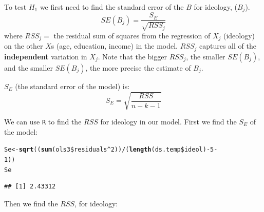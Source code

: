 \documentclass[11pt,openany]{book}\usepackage[]{graphicx}\usepackage[]{color}
\makeatletter
\newcommand{\hlnum}[1]{\textcolor[rgb]{0.686,0.059,0.569}{#1}}%
\newcommand{\hlopt}[1]{\textcolor[rgb]{0,0,0}{#1}}%
\newcommand{\hlstd}[1]{\textcolor[rgb]{0.345,0.345,0.345}{#1}}%
\newcommand{\hlkwb}[1]{\textcolor[rgb]{0.69,0.353,0.396}{#1}}%
\newcommand{\hlkwd}[1]{\textcolor[rgb]{0.737,0.353,0.396}{\textbf{#1}}}%
\newenvironment{kframe}{%
 \def\at@end@of@kframe{}%
 \ifinner\ifhmode%
  \def\at@end@of@kframe{\end{minipage}}%
  \begin{minipage}{\columnwidth}%
 \fi\fi%
 \def\FrameCommand##1{\hskip\@totalleftmargin \hskip-\fboxsep
 \colorbox{shadecolor}{##1}\hskip-\fboxsep
     \hskip-\linewidth \hskip-\@totalleftmargin \hskip\columnwidth}%
 \MakeFramed {\advance\hsize-\width
   \@totalleftmargin\z@ \linewidth\hsize
   \@setminipage}}%
 {\par\unskip\endMakeFramed%
 \at@end@of@kframe}
\newenvironment{knitrout}{}{} %
\renewenvironment{knitrout}{\begin{singlespace}}{\end{singlespace}}
\makeatother
\begin{document}
To test $H_1$ we first need to find the standard error of the $B$ for ideology, ($B_j$).  
\begin{equation}
  SE(B_j) = \frac{S_E}{\sqrt{RSS_j}} 
\end{equation}
\noindent where $RSS_j =$ the residual sum of squares from the regression of $X_j$ (ideology) on the other $X$s (age, education, income) in the model. $RSS_j$ captures all of the \textbf{independent} variation in $X_j$. Note that the bigger $RSS_j$, the smaller $SE(B_j)$, and the smaller $SE(B_j)$, the more precise the estimate of $B_j$.
 
$S_E$ (the standard error of the model) is:
\begin{equation*}
 S_E = \sqrt{\frac{RSS}{n-k-1}}
\end{equation*}

We can use \texttt{R} to find the $RSS$ for ideology in our model. First we find the $S_E$ of the model: 
\begin{knitrout}
\color{fgcolor}\begin{kframe}
\begin{alltt}
\hlstd{Se} \hlkwb{<-} \hlkwd{sqrt}\hlstd{((}\hlkwd{sum}\hlstd{(ols3}\hlopt{\$}\hlstd{residuals}\hlopt{^}\hlnum{2}\hlstd{))}\hlopt{/}\hlstd{(}\hlkwd{length}\hlstd{(ds.temp}\hlopt{\$}\hlstd{ideol)} \hlopt{-} \hlnum{5} \hlopt{-}
    \hlnum{1}\hlstd{))}
\hlstd{Se}
\end{alltt}
\begin{verbatim}
## [1] 2.43312
\end{verbatim}
\end{kframe}
\end{knitrout}
Then we find the $RSS$, for ideology:
\end{document}
